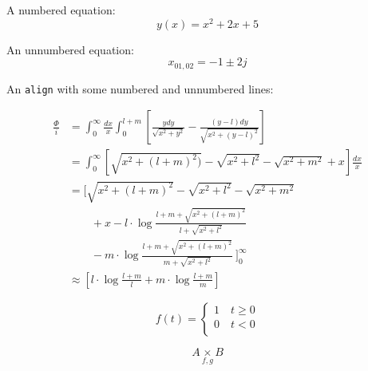 \documentclass[a4paper,11pt,oneside,showtrims]{alpenthesis}
\begin{document}
A numbered equation:
\begin{equation}
    y(x) = x^2 + 2x + 5
\end{equation}

An unnumbered equation:
\begin{equation*}
    x_{01,02} = -1 \pm 2j
\end{equation*}

An \verb|align| with some numbered and unnumbered lines:

\begin{align}
    \frac{\Phi}{i}
    & =
    \int_{0}^{\infty} \frac{dx}{x} \int_{0}^{l+m}
    \left[
        \frac{y dy}{\sqrt{x^2+y^2}} - \frac{(y-l) dy}{\sqrt{x^2+(y-l)^2}}
    \right]
    \nonumber
    \\
    &=
    \int_{0}^{\infty}
    \left[
        \sqrt{x^2 + (l+m)^2)} - \sqrt{x^2+l^2} - \sqrt{x^2+m^2}+x
    \right]
    \frac{dx}{x}
    \nonumber
    \\
    &=
    \Bigg[
        \sqrt{x^2 + (l+m)^2} - \sqrt{x^2+l^2} - \sqrt{x^2+m^2}
        \nonumber
        \\
        & ~~~~~~~~~   + x - l \cdot \log{\frac{l+m+\sqrt{x^2+(l+m)^2}}{l+\sqrt{x^2+l^2}}}
        \nonumber
        \\
        & ~~~~~~~~~   - m \cdot \log{\frac{l+m+\sqrt{x^2+(l+m)^2}}{m+\sqrt{x^2+l^2}}} ~
    \Bigg]_0^{\infty}
    \label{eq:mISL:2}
    \\
    & \approx
    \left[ l \cdot \log{\frac{l+m}{l}} + m \cdot \log{\frac{l+m}{m}} \right]
    \label{eq:mISL:3}
\end{align}

\begin{equation}
    f(t) =
    \begin{cases}
        1 \quad t \geq 0\\
        0 \quad t < 0\\
    \end{cases}
\end{equation}

\begin{equation}
    A \underset{f,g}{\times} B
\end{equation}

\cleardoublepage
\begin{titlingpage*}
    \begin{vplace}
        \flushright\Huge\bfseries\sffamily\appendixpagename
    \end{vplace}
\end{titlingpage*}
\appendix
{}
\end{document}
